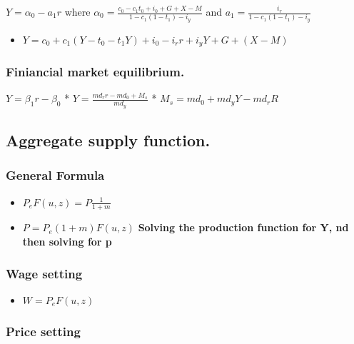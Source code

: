 \documentclass[,twocolumn]{article}
\providecommand{\tightlist}{%
  \setlength{\itemsep}{0pt}\setlength{\parskip}{0pt}}
\begin{document}
\(Y = \alpha_0 - a_1 r\) where
\(\alpha_0 = \frac{c_0 - c_1t_0 + i_0 +G + X-M}{1-c_1(1-t_1 )-i_y}\) and
\(a_1 = \frac{i_r}{1-c_1(1-t_1)-i_y}\)

\begin{itemize}
\tightlist
\item
  \(Y = c_0 + c_1(Y - t_0 -t_1Y) +i_0 - i_r r + i_yY + G +(X-M)\)
\end{itemize}

\hypertarget{finiancial-market-equilibrium.}{%
\subsubsection{Finiancial market
equilibrium.}\label{finiancial-market-equilibrium.}}

\(Y = \beta_1 r - \beta_0\) * \(Y = \frac{md_r r - md_0 + M_s}{md _y}\)
* \(M_s = md_0 + md_yY -md_rR\)

\hypertarget{aggregate-supply-function.}{%
\subsection{Aggregate supply
function.}\label{aggregate-supply-function.}}

\hypertarget{general-formula}{%
\subsubsection{General Formula}\label{general-formula}}

\begin{itemize}
\tightlist
\item
  \(P_e F(u,z) = P \frac{1}{1+m}\)
\item
  \(P = P_e(1+m)F(u,z)\) \textbf{Solving the production function for Y,
  nd then solving for p}
\end{itemize}

\hypertarget{wage-setting}{%
\subsubsection{Wage setting}\label{wage-setting}}

\begin{itemize}
\tightlist
\item
  \(W = P_e F(u,z)\)
\end{itemize}

\hypertarget{price-setting}{%
\subsubsection{Price setting}\label{price-setting}}
\end{document}

